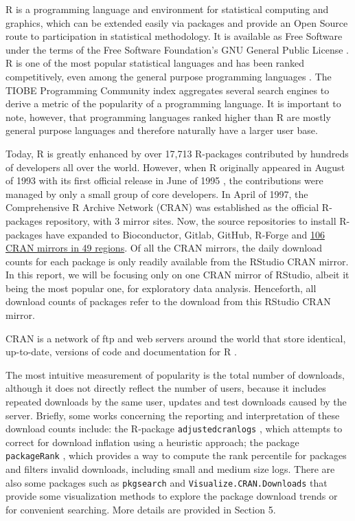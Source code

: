 \documentclass[
]{book}
\begin{document}
R is a programming language and environment for statistical computing and graphics, which can be extended easily via packages and provide an Open Source route to participation in statistical methodology. It is available as Free Software under the terms of the Free Software Foundation's GNU General Public License \citep{gnu}. R is one of the most popular statistical languages and has been ranked competitively, even among the general purpose programming languages \citep[peaking 8th in August 2020 in][]{tiobe}. The TIOBE Programming Community index aggregates several search engines to derive a metric of the popularity of a programming language. It is important to note, however, that programming languages ranked higher than R are mostly general purpose languages and therefore naturally have a larger user base.

Today, R is greatly enhanced by over 17,713 R-packages contributed by hundreds of developers all over the world. However, when R originally appeared in August of 1993 with its first official release in June of 1995 \citep{Ikaha1998}, the contributions were managed by only a small group of core developers. In April of 1997, the Comprehensive R Archive Network (CRAN) was established as the official R-packages repository, with 3 mirror sites. Now, the source repositories to install R-packages have expanded to Bioconductor, Gitlab, GitHub, R-Forge and \href{https://cran.r-project.org/mirmon_report.html}{106 CRAN mirrors in 49 regions}. Of all the CRAN mirrors, the daily download counts for each package is only readily available from the RStudio CRAN mirror. In this report, we will be focusing only on one CRAN mirror of RStudio, albeit it being the most popular one, for exploratory data analysis. Henceforth, all download counts of packages refer to the download from this RStudio CRAN mirror.

CRAN is a network of ftp and web servers around the world that store identical, up-to-date, versions of code and documentation for R \citep{CRAN}.

The most intuitive measurement of popularity is the total number of downloads, although it does not directly reflect the number of users, because it includes repeated downloads by the same user, updates and test downloads caused by the server. Briefly, some works concerning the reporting and interpretation of these download counts include: the R-package \texttt{adjustedcranlogs} \citep{adjustedcranlogs}, which attempts to correct for download inflation using a heuristic approach; the package \texttt{packageRank} \citep{packageRank}, which provides a way to compute the rank percentile for packages and filters invalid downloads, including small and medium size logs. There are also some packages such as \texttt{pkgsearch}\citep{pkgsearch} and \texttt{Visualize.CRAN.Downloads}\citep{VisualizeCRANDownloads} that provide some visualization methods to explore the package download trends or for convenient searching. More details are provided in Section 5.
\end{document}
